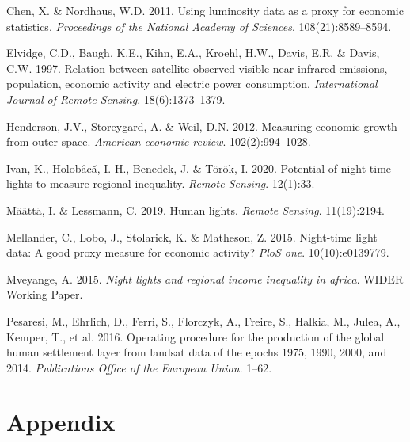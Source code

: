 \documentclass[11pt,preprint, authoryear]{elsarticle}
\numberwithin{equation}{section}
\numberwithin{figure}{section}
\numberwithin{table}{section}
\newlength{\cslhangindent}
\newenvironment{CSLReferences}%
  {\setlength{\parindent}{0pt}%
  \everypar{\setlength{\hangindent}{\cslhangindent}}\ignorespaces}%
  {\par}
\begin{document}
\hypertarget{refs}{}
\begin{CSLReferences}{1}{0}
\leavevmode{}%
Chen, X. \& Nordhaus, W.D. 2011. Using luminosity data as a proxy for
economic statistics. \emph{Proceedings of the National Academy of
Sciences}. 108(21):8589--8594.

\leavevmode{}%
Elvidge, C.D., Baugh, K.E., Kihn, E.A., Kroehl, H.W., Davis, E.R. \&
Davis, C.W. 1997. Relation between satellite observed visible-near
infrared emissions, population, economic activity and electric power
consumption. \emph{International Journal of Remote Sensing}.
18(6):1373--1379.

\leavevmode{}%
Henderson, J.V., Storeygard, A. \& Weil, D.N. 2012. Measuring economic
growth from outer space. \emph{American economic review}.
102(2):994--1028.

\leavevmode{}%
Ivan, K., Holobâcă, I.-H., Benedek, J. \& Török, I. 2020. Potential of
night-time lights to measure regional inequality. \emph{Remote Sensing}.
12(1):33.

\leavevmode{}%
Määttä, I. \& Lessmann, C. 2019. Human lights. \emph{Remote Sensing}.
11(19):2194.

\leavevmode{}%
Mellander, C., Lobo, J., Stolarick, K. \& Matheson, Z. 2015. Night-time
light data: A good proxy measure for economic activity? \emph{PloS one}.
10(10):e0139779.

\leavevmode{}%
Mveyange, A. 2015. \emph{Night lights and regional income inequality in
africa}. WIDER Working Paper.

\leavevmode{}%
Pesaresi, M., Ehrlich, D., Ferri, S., Florczyk, A., Freire, S., Halkia,
M., Julea, A., Kemper, T., et al. 2016. Operating procedure for the
production of the global human settlement layer from landsat data of the
epochs 1975, 1990, 2000, and 2014. \emph{Publications Office of the
European Union}. 1--62.

\end{CSLReferences}

\newpage

\hypertarget{appendix}{%
\section*{Appendix}\label{appendix}}
\end{document}
